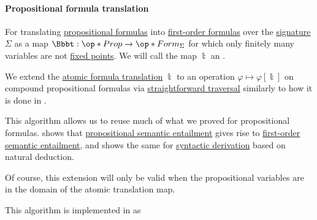 \paragraph{Propositional formula translation}

\begin{definition}\label{def:atomic_fol_propositional_formula_translation}\mimprovised
  For translating \hyperref[def:propositional_formula]{propositional formulas} into \hyperref[def:fol_formula]{first-order formulas} over the \hyperref[def:fol_signature]{signature} \( \Sigma \) as a map \( \Bbbt: \op*{Prop} \to \op*{Form}_\Sigma \) for which only finitely many variables are not \hyperref[def:function_fixed_point]{fixed points}. We will call the map \( \Bbbt \) an .
\end{definition}

\begin{algorithm}\label{alg:fol_propositional_formula_translation}
  We extend the \hyperref[def:atomic_fol_propositional_formula_translation]{atomic formula translation} \( \Bbbt \) to an operation \( \varphi \mapsto \varphi[\Bbbt] \) on compound propositional formulas via \hyperref[rem:straightforward_traversal]{straightforward traversal} similarly to how it is done in .
\end{algorithm}
\begin{comments}
  \item This algorithm allows us to reuse much of what we proved for propositional formulas.  shows that \hyperref[def:propositional_semantics/entailment]{propositional semantic entailment} gives rise to \hyperref[def:fol_semantics/entailment]{first-order semantic entailment}, and  shows the same for \hyperref[def:fol_natural_deduction_consequence]{syntactic derivation} based on natural deduction.

  \item Of course, this extension will only be valid when the propositional variables are in the domain of the atomic translation map.

  \item This algorithm is implemented in \cite{notebook:code} as
  \begin{CodeRefDisplay}
  \end{CodeRefDisplay}
\end{comments}

